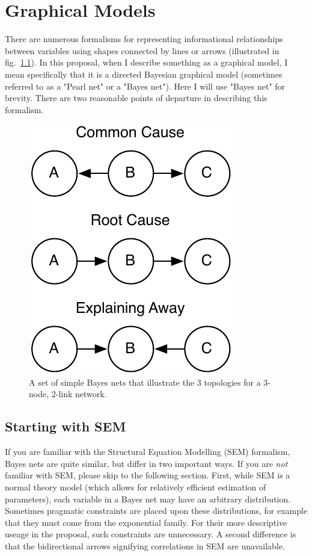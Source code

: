 \graphicspath{{graphical-models/}}

\chapter{Graphical Models}

There are numerous formalisms for representing informational relationships
between variables using shapes connected by lines or arrows (illustrated in
fig.~\ref{fig:bayes}). In this proposal, when I describe something as a
graphical model, I mean specifically that it is a directed Bayesian graphical
model (sometimes referred to as a "Pearl net" or a "Bayes net"). Here I will use
"Bayes net" for brevity.  There are two reasonable points of departure in
describing this formalism.

\begin{figure}
\begin{center}
\includegraphics{bayes-nets.pdf}
\end{center}
\caption{A set of simple Bayes nets that illustrate the 3 topologies for a
    3-node, 2-link network.}
\label{fig:bayes}
\end{figure}

\section{Starting with SEM}

If you are familiar with the Structural Equation Modelling (SEM) formalism,
Bayes nets are quite similar, but differ in two
important ways. If you are \emph{not} familiar with SEM, please skip to the
following section. First, while SEM is a normal theory model (which allows for
relatively efficient estimation of parameters), each variable in a Bayes net may
have an arbitrary distribution. Sometimes pragmatic constraints are
placed upon these distributions, for example that they must come from the
exponential family. For their more descriptive useage in the proposal, such
constraints are unnecessary. A second difference is that the bidirectional arrows
signifying correlations in SEM are unavailable.

